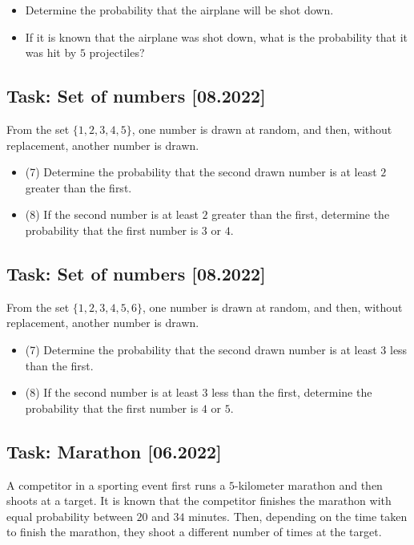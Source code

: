 \documentclass[a4paper, 12pt]{article}
\begin{document}
\begin{itemize}
    \item [a)] Determine the probability that the airplane will be shot down.
    \item [b)] If it is known that the airplane was shot down, what is the probability that it was hit by $5$ projectiles?
\end{itemize}


\subsection*{Task: Set of numbers [08.2022]}


From the set $\{1, 2, 3, 4, 5\}$, one number is drawn at random, and then, without replacement, another number is drawn.

\begin{itemize}
    \item [a)] (7) Determine the probability that the second drawn number is at least $2$ greater than the first.
    \item [b)] (8) If the second number is at least $2$ greater than the first, determine the probability that the first number is $3$ or $4$.
\end{itemize}


\subsection*{Task: Set of numbers [08.2022]}

From the set $\{1, 2, 3, 4, 5, 6\}$, one number is drawn at random, and then, without replacement, another number is drawn.

\begin{itemize}
    \item [a)] (7) Determine the probability that the second drawn number is at least $3$ less than the first.
    \item [b)] (8) If the second number is at least $3$ less than the first, determine the probability that the first number is $4$ or $5$.
\end{itemize}





\subsection*{Task: Marathon [06.2022]}

A competitor in a sporting event first runs a $5$-kilometer marathon and then shoots at a target. It is known that the competitor finishes the marathon with equal probability between $20$ and $34$ minutes. Then, depending on the time taken to finish the marathon, they shoot a different number of times at the target.
\end{document}
